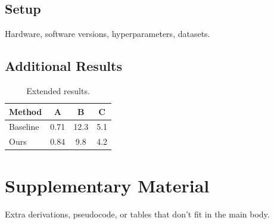 \documentclass[11pt]{article}
\theoremstyle{definition}
\theoremstyle{remark}
\begin{document}
\subsection{Setup}
Hardware, software versions, hyperparameters, datasets.

\subsection{Additional Results}
\begin{table}[h]
  \centering
  \caption{Extended results.}\label{tab:extended}
  \begin{tabular}{lccc}
    \toprule
    Method & A & B & C \\
    \midrule
    Baseline & 0.71 & 12.3 & 5.1 \\
    Ours     & 0.84 & 9.8  & 4.2 \\
    \bottomrule
  \end{tabular}
\end{table}

\section{Supplementary Material}\label{app:supp}
Extra derivations, pseudocode, or tables that don't fit in the main body.
\end{document}
